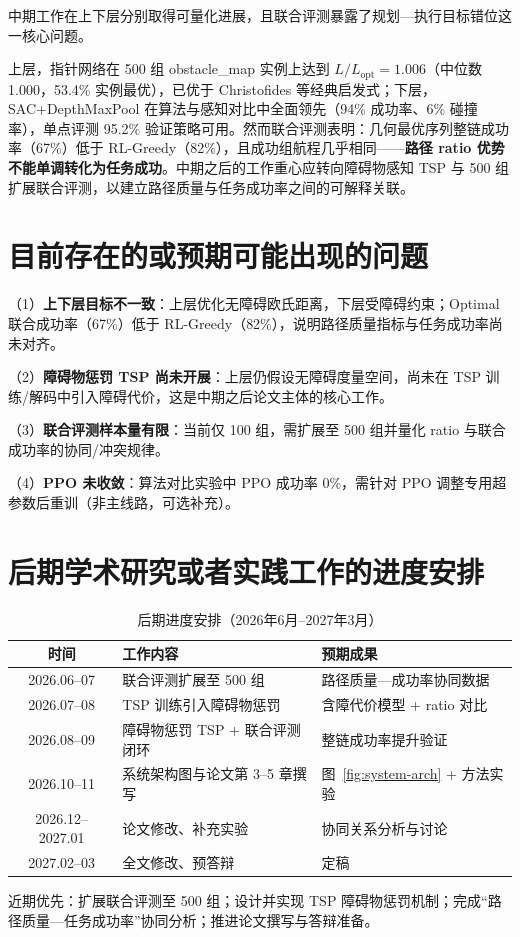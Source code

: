 中期工作在上下层分别取得可量化进展，且联合评测暴露了规划—执行目标错位这一核心问题。

上层，指针网络在 500 组 obstacle\_map 实例上达到 $L/L_{\mathrm{opt}}=1.006$（中位数 1.000，53.4\% 实例最优），已优于 Christofides 等经典启发式；下层，SAC+DepthMaxPool 在算法与感知对比中全面领先（94\% 成功率、6\% 碰撞率），单点评测 95.2\% 验证策略可用。然而联合评测表明：几何最优序列整链成功率（67\%）低于 RL-Greedy（82\%），且成功组航程几乎相同——\textbf{路径 ratio 优势不能单调转化为任务成功}。中期之后的工作重心应转向障碍物感知 TSP 与 500 组扩展联合评测，以建立路径质量与任务成功率之间的可解释关联。

\section{目前存在的或预期可能出现的问题}

（1）\textbf{上下层目标不一致}：上层优化无障碍欧氏距离，下层受障碍约束；Optimal 联合成功率（67\%）低于 RL-Greedy（82\%），说明路径质量指标与任务成功率尚未对齐。

（2）\textbf{障碍物惩罚 TSP 尚未开展}：上层仍假设无障碍度量空间，尚未在 TSP 训练/解码中引入障碍代价，这是中期之后论文主体的核心工作。

（3）\textbf{联合评测样本量有限}：当前仅 100 组，需扩展至 500 组并量化 ratio 与联合成功率的协同/冲突规律。

（4）\textbf{PPO 未收敛}：算法对比实验中 PPO 成功率 0\%，需针对 PPO 调整专用超参数后重训（非主线路，可选补充）。

\section{后期学术研究或者实践工作的进度安排}

\begin{table}[htbp]
  \centering
  \caption{后期进度安排（2026年6月--2027年3月）}
  \label{tab:schedule}
  \begin{tabular}{clp{5.2cm}}
    \toprule
    时间 & 工作内容 & 预期成果 \\
    \midrule
    2026.06--07 & 联合评测扩展至 500 组 & 路径质量—成功率协同数据 \\
    2026.07--08 & TSP 训练引入障碍物惩罚 & 含障代价模型 + ratio 对比 \\
    2026.08--09 & 障碍物惩罚 TSP + 联合评测闭环 & 整链成功率提升验证 \\
    2026.10--11 & 系统架构图与论文第 3--5 章撰写 & 图~\ref{fig:system-arch} + 方法实验 \\
    2026.12--2027.01 & 论文修改、补充实验 & 协同关系分析与讨论 \\
    2027.02--03 & 全文修改、预答辩 & 定稿 \\
    \bottomrule
  \end{tabular}
\end{table}

近期优先：扩展联合评测至 500 组；设计并实现 TSP 障碍物惩罚机制；完成``路径质量—任务成功率''协同分析；推进论文撰写与答辩准备。



